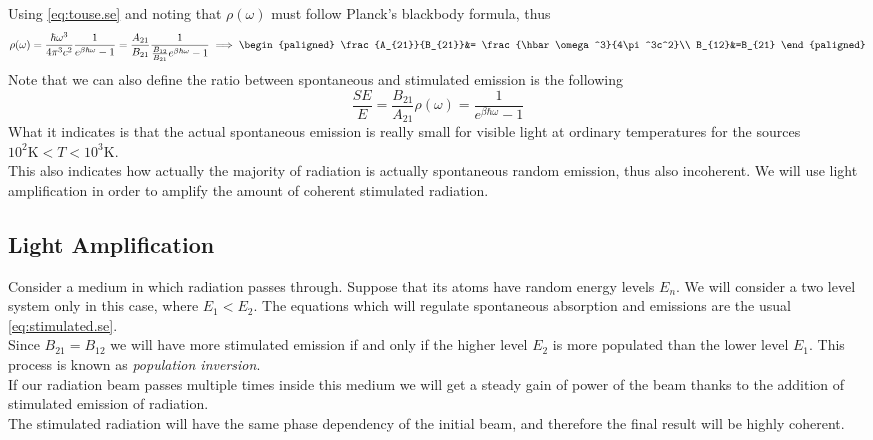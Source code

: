 \documentclass[../electromagnetism.tex]{subfiles}
\begin{document}
Using \eqref{eq:touse.se} and noting that $\rho(\omega)$ must follow Planck's blackbody formula, thus
\begin{equation}
	\rho(\omega)=\frac{\hbar\omega^3}{4\pi^3c^2}\frac{1}{e^{\beta\hbar\omega}-1}=\frac{A_{21}}{B_{21}}\frac{1}{\frac{B_{12}}{B_{21}}e^{\beta\hbar\omega}-1}\implies\begin{paligned}
		\frac{A_{21}}{B_{21}}&= \frac{\hbar\omega^3}{4\pi^3c^2}\\
		B_{12}&=B_{21}
	\end{paligned}
	\label{eq:bbody.se}
\end{equation}
Note that we can also define the ratio between spontaneous and stimulated emission is the following
\begin{equation*}
	\frac{SE}{E}=\frac{B_{21}}{A_{21}}\rho(\omega)=\frac{1}{e^{\beta\hbar\omega}-1}
\end{equation*}
What it indicates is that the actual spontaneous emission is really small for visible light at ordinary temperatures for the sources $10^2\mathrm{ K}<T<10^3\mathrm{ K}$.\\
This also indicates how actually the majority of radiation is actually spontaneous random emission, thus also incoherent. We will use light amplification in order to amplify the amount of coherent stimulated radiation.
\subsection{Light Amplification}
Consider a medium in which radiation passes through. Suppose that its atoms have random energy levels $E_n$. We will consider a two level system only in this case, where $E_1<E_2$. The equations which will regulate spontaneous absorption and emissions are the usual \eqref{eq:stimulated.se}.\\
Since $B_{21}=B_{12}$ we will have more stimulated emission if and only if the higher level $E_2$ is more populated than the lower level $E_1$. This process is known as \textit{population inversion}.\\
If our radiation beam passes multiple times inside this medium we will get a steady gain of power of the beam thanks to the addition of stimulated emission of radiation.\\
The stimulated radiation will have the same phase dependency of the initial beam, and therefore the final result will be highly coherent. 
\end{document}
